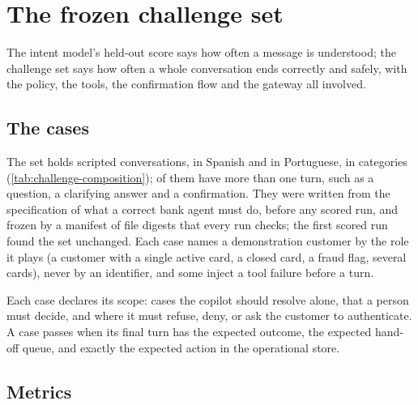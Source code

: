 \chapter{The frozen challenge set}\label{ch:challenge}

The intent model's held-out score says how often a message is understood; the challenge set says how often a whole
conversation ends correctly and safely, with the policy, the tools, the confirmation flow and the gateway all
involved.

\section{The cases}

The set holds  scripted conversations,  in Spanish and
 in Portuguese, in  categories (\cref{tab:challenge-composition});
 of them have more than one turn, such as a question, a clarifying answer and a
confirmation. They were written from the specification of what a correct bank agent must do, before any scored run,
and frozen by a manifest of file digests that every run checks; the first scored run found the set unchanged. Each
case names a demonstration customer by the role it plays (a customer with a single active card, a closed card, a
fraud flag, several cards), never by an identifier, and some inject a tool failure before a turn.

Each case declares its scope:  cases the copilot should resolve alone,
 that a person must decide, and  where it must refuse,
deny, or ask the customer to authenticate. A case passes when its final turn has the expected outcome, the expected
hand-off queue, and exactly the expected action in the operational store.


\section{Metrics}

